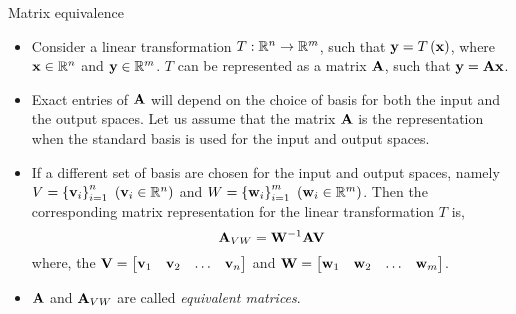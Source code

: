 \documentclass[aspectratio=169]{beamer}
\def\mf{\ensuremath\mathbf}
\def\mb{\ensuremath\mathbb}
\def\lp{\ensuremath\left(}
\def\rp{\ensuremath\right)}
\def\lc{\ensuremath\left\{}
\def\rc{\ensuremath\right\}}
\def\bmx{\ensuremath\begin{bmatrix*}[r]}
\def\emx{\ensuremath\end{bmatrix*}}
\begin{document}
\begin{frame}[t]{Matrix equivalence}
\begin{itemize}
    \item Consider a linear transformation $T:\mb{R}^{n} \to \mb{R}^m$, such that $\mf{y} = T\lp\mf{x}\rp$, where $\mf{x} \in \mb{R}^n$ and $\mf{y} \in \mb{R}^m$. $T$ can be represented as a matrix $\mf{A}$, such that $\mf{y} = \mf{A}\mf{x}$.

    \item Exact entries of $\mf{A}$ will depend on the choice of basis for both the input and the output spaces. Let us assume that the matrix $\mf{A}$ is the representation when the standard basis is used for the input and output spaces.

    \item If a different set of basis are chosen for the input and output spaces, namely $V = \lc\mf{v}_i\rc_{i=1}^{n}\,\,\lp\mf{v}_i \in \mb{R}^n\rp$ and $W = \lc\mf{w}_i\rc_{i=1}^{m}\,\,\lp\mf{w}_i \in \mb{R}^m\rp$. Then the corresponding matrix representation for the linear transformation $T$ is,
    \[ \mf{A}_{VW} = \mf{W}^{-1}\mf{A}\mf{V} \]
    where, the $\mf{V} = \bmx\mf{v}_1 & \mf{v}_2 & \ldots & \mf{v}_n\emx$ and $\mf{W} = \bmx\mf{w}_1 & \mf{w}_2 & \ldots & \mf{w}_m\emx$.

    \item $\mf{A}$ and $\mf{A}_{VW}$ are called \textit{equivalent matrices}.
\end{itemize}
\end{frame}
\end{document}
